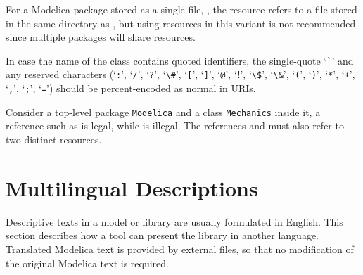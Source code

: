 For a Modelica-package stored as a single file, , the resource  refers to a file  stored in the same directory as , but using resources in this variant is not recommended since multiple packages will share resources.

In case the name of the class contains quoted identifiers, the single-quote `\lstinline!`!' and any reserved characters (`\lstinline!:!', `\lstinline!/!', `\lstinline!?!', `\lstinline!\#!', `\lstinline![!', `\lstinline!]!', `\lstinline!@!', `\lstinline!!!', `\lstinline[mathescape=false]!\$!', `\lstinline!\&!', `\lstinline!(!', `\lstinline!)!', `\lstinline!*!', `\lstinline!+!', `\lstinline!,!', `\lstinline!;!', `\lstinline!=!') should be percent-encoded as normal in URIs.

\begin{example}
Consider a top-level package \lstinline!Modelica! and a class \lstinline!Mechanics! inside it, a reference such as  is legal, while  is illegal.
The references  and  must also refer to two distinct resources.
\end{example}


\section{Multilingual Descriptions}\label{multilingual-descriptions}

\begin{nonnormative}
Descriptive texts in a model or library are usually formulated in English.
This section describes how a tool can present the library in another language.
Translated Modelica text is provided by external files, so that no modification of the original Modelica text is required.
\end{nonnormative}

